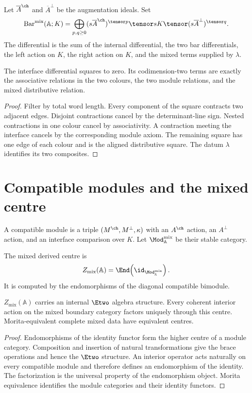\begin{construction}
Let $\overline A^{\ch}$ and $\overline A^\perp$ be the augmentation ideals.  Set
\[
 \BarMix(\mathbb A;K)
 =\bigoplus_{p,q\ge0}
 (s\overline A^{\ch})^{\tensor p}\tensor sK\tensor
 (s\overline A^\perp)^{\tensor q}.
\]
The differential is the sum of the internal differential, the two bar differentials, the left action on $K$, the right action on $K$, and the mixed terms supplied by $\lambda$.
\end{construction}

\begin{theorem}
The interface differential squares to zero.  Its codimension-two terms are exactly the associative relations in the two colours, the two module relations, and the mixed distributive relation.
\end{theorem}
\begin{proof}
Filter by total word length.  Every component of the square contracts two adjacent edges.  Disjoint contractions cancel by the determinant-line sign.  Nested contractions in one colour cancel by associativity.  A contraction meeting the interface cancels by the corresponding module axiom.  The remaining square has one edge of each colour and is the aligned distributive square.  The datum $\lambda$ identifies its two composites.
\end{proof}

\chapter{Compatible modules and the mixed centre}
A compatible module is a triple $(M^{\ch},M^\perp,\kappa)$ with an $A^{\ch}$ action, an $A^\perp$ action, and an interface comparison over $K$.  Let $\Mod_{\mathbb A}^{\mathrm{mix}}$ be their stable category.

\begin{definition}
The mixed derived centre is
\[
 Z_{\mathrm{mix}}(\mathbb A)
 =\End\!\left(\id_{\Mod_{\mathbb A}^{\mathrm{mix}}}\right).
\]
It is computed by the endomorphisms of the diagonal compatible bimodule.
\end{definition}

\begin{theorem}
$Z_{\mathrm{mix}}(\mathbb A)$ carries an internal $\Etwo$ algebra structure.  Every coherent interior action on the mixed boundary category factors uniquely through this centre.  Morita-equivalent complete mixed data have equivalent centres.
\end{theorem}
\begin{proof}
Endomorphisms of the identity functor form the higher centre of a module category.  Composition and insertion of natural transformations give the brace operations and hence the $\Etwo$ structure.  An interior operator acts naturally on every compatible module and therefore defines an endomorphism of the identity.  The factorization is the universal property of the endomorphism object.  Morita equivalence identifies the module categories and their identity functors.
\end{proof}

